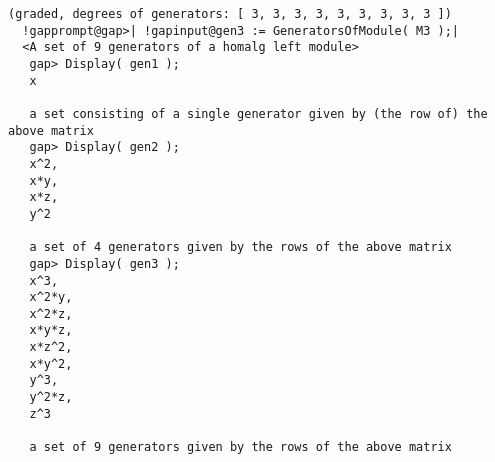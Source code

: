 \documentclass[a4paper,11pt]{report}
\begin{document}
{{{\begin{Verbatim}[commandchars=!@|,fontsize=\small,frame=single,label=Example]
  (graded, degrees of generators: [ 3, 3, 3, 3, 3, 3, 3, 3, 3 ])
  !gapprompt@gap>| !gapinput@gen3 := GeneratorsOfModule( M3 );|
  <A set of 9 generators of a homalg left module>
   gap> Display( gen1 );
   x
   
   a set consisting of a single generator given by (the row of) the above matrix
   gap> Display( gen2 );
   x^2,
   x*y,
   x*z,
   y^2 
   
   a set of 4 generators given by the rows of the above matrix
   gap> Display( gen3 );
   x^3,  
   x^2*y,
   x^2*z,
   x*y*z,
   x*z^2,
   x*y^2,
   y^3,  
   y^2*z,
   z^3   
   
   a set of 9 generators given by the rows of the above matrix
\end{Verbatim}
 }

 }

  }

   
\end{document}

